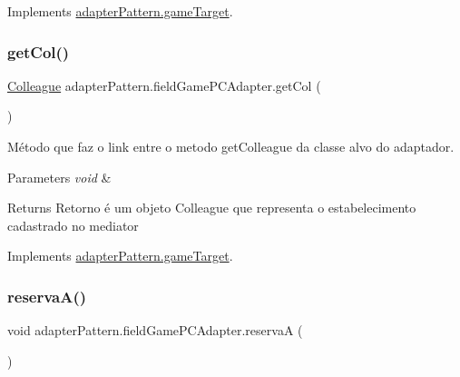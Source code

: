 Implements \mbox{\hyperlink{interfaceadapter_pattern_1_1game_target_a32fce3f3dd420116a031b051f2464304}{adapter\+Pattern.\+game\+Target}}.

\mbox{\label{classadapter_pattern_1_1field_game_p_c_adapter_a6f4f583609bc9bbef0de01f0b845f208}} 
\subsubsection{\texorpdfstring{getCol()}{getCol()}}
{\footnotesize\ttfamily \mbox{\hyperlink{classmediator_pattern_1_1_colleague}{Colleague}} adapter\+Pattern.\+field\+Game\+P\+C\+Adapter.\+get\+Col (\begin{DoxyParamCaption}{ }\end{DoxyParamCaption})}



Método que faz o link entre o metodo get\+Colleague da classe alvo do adaptador. 


\begin{DoxyParams}{Parameters}
{\em void} & \\
\hline
\end{DoxyParams}
\begin{DoxyReturn}{Returns}
Retorno é um objeto Colleague que representa o estabelecimento cadastrado no mediator 
\end{DoxyReturn}


Implements \mbox{\hyperlink{interfaceadapter_pattern_1_1game_target_ad3fc8b4c4a732bcc875071ed0c081261}{adapter\+Pattern.\+game\+Target}}.

\mbox{\label{classadapter_pattern_1_1field_game_p_c_adapter_ac20a8fa30e0ad92ffcac1d4b124a7000}} 
\subsubsection{\texorpdfstring{reservaA()}{reservaA()}}
{\footnotesize\ttfamily void adapter\+Pattern.\+field\+Game\+P\+C\+Adapter.\+reservaA (\begin{DoxyParamCaption}{ }\end{DoxyParamCaption})}



